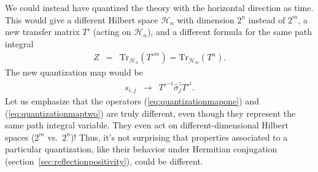 \documentclass{ws-rv9x6}
\newcommand\be{\begin{eqnarray}}
\newcommand\ee{\end{eqnarray}}
\newcommand\<\langle
\renewcommand\>\rangle
\renewcommand\.{\cdot}
\newcommand\s\sigma
\newcommand\cH{\mathcal{H}}
\newcommand\Tr{\mathrm{Tr}}
\begin{document}
\begin{appendix}
We could instead have quantized the theory with the horizontal direction as time.  This would give a different Hilbert space $\cH_n$ with dimension $2^n$ instead of $2^m$, a new transfer matrix $T'$ (acting on $\cH_n$), and a different formula for the same path integral
\be
Z &=& \Tr_{\cH_n}(T'^m)=\Tr_{\cH_m}(T^n).
\ee
The new quantization map would be
\be
\label{eq:quantizationmaptwo}
s_{i,j} &\to& T'^{-i} \widehat \s_j^z T'^i.
\ee
Let us emphasize that the operators (\ref{eq:quantizationmapone}) and (\ref{eq:quantizationmaptwo}) are truly different, even though they represent the same path integral variable.  They even act on different-dimensional Hilbert spaces ($2^m$ vs.\ $2^n$)!  Thus, it's not surprising that properties associated to a particular quantization, like their behavior under Hermitian conjugation (section~\ref{sec:reflectionpositivity}), could be different.

\vspace{0.2in}

\end{appendix}
\end{document}
